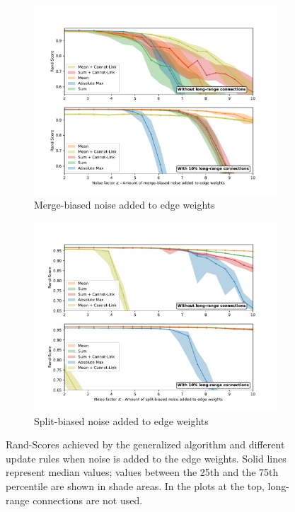% 

\begin{figure}
\centering
        \begin{subfigure}[t]{0.49 \textwidth}
        \centering
        \includegraphics[width=\textwidth,trim=0.55in 0.35in 0.65in 0.80in,clip]{./figs/merge_noise.pdf}

        \caption{Merge-biased noise added to edge weights} \label{fig:thresh}
    \end{subfigure}%
    \begin{subfigure}[t]{0.49 \textwidth}
        \centering
        \includegraphics[width=\textwidth,trim=0.53in 0.35in 0.65in 0.80in,clip]{./figs/split_noise.pdf}
        \caption{Split-biased noise added to edge weights} \label{fig:ws}
    \end{subfigure}


\caption{{\small Rand-Scores achieved by the generalized algorithm and different update rules when noise is added to the edge weights. Solid lines represent median values; values between the 25th and the 75th percentile are shown in shade areas. In the plots at the top, long-range connections are not used.}}\label{fig:noise_plots}
\end{figure}

